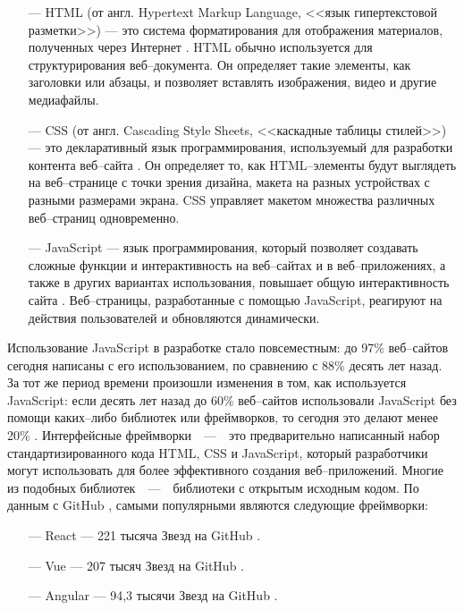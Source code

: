 \begin{itemize}
	\item[---] HTML (от англ. Hypertext Markup Language,  <<язык гипертекстовой разметки>>) --- это система форматирования для отображения материалов, полученных через Интернет \cite{html}. 
	HTML обычно используется для структурирования веб--документа. Он определяет такие элементы, как заголовки или абзацы, и позволяет вставлять изображения, видео и другие медиафайлы.
	\item[---] CSS (от англ. Cascading Style Sheets,  <<каскадные таблицы стилей>>) --- это декларативный язык программирования, используемый для разработки контента веб--сайта \cite{css}. 
	Он определяет то, как HTML--элементы будут выглядеть на веб--странице с точки зрения дизайна, макета на разных устройствах с разными размерами экрана. 
	CSS управляет макетом множества различных веб--страниц одновременно.
	\item[---] JavaScript --- язык программирования, который позволяет создавать сложные функции и интерактивность на веб--сайтах и в веб--приложениях, а также в других вариантах использования, повышает общую интерактивность сайта \cite{js}. 
	Веб--страницы, разработанные с помощью JavaScript, реагируют на действия пользователей и обновляются динамически. %
\end{itemize}

Использование JavaScript в разработке стало повсеместным: до 97\% веб--сайтов сегодня написаны с его использованием, по сравнению с 88\% десять лет назад. 
За тот же период времени произошли изменения в том, как используется JavaScript: если десять лет назад до 60\% веб--сайтов использовали JavaScript без помощи каких--либо библиотек или фреймворков, то сегодня это делают менее 20\% \cite{сomparison}.
Интерфейсные фреймворки~~---~~это предварительно написанный набор стандартизированного кода HTML, CSS и JavaScript, который разработчики могут использовать для более эффективного создания веб--приложений.
Многие из подобных библиотек~~---~~библиотеки с открытым исходным кодом. По данным с GitHub \cite{github}, самыми популярными являются следующие фреймворки:

\begin{itemize}
	\item[---] React --- 221 тысяча Звезд на GitHub \cite{react-github}.
	\item[---] Vue ---  207 тысяч Звезд на GitHub \cite{vue-github}.
	\item[---] Angular --- 94,3 тысячи Звезд на GitHub \cite{angular-github}.
\end{itemize}
  
